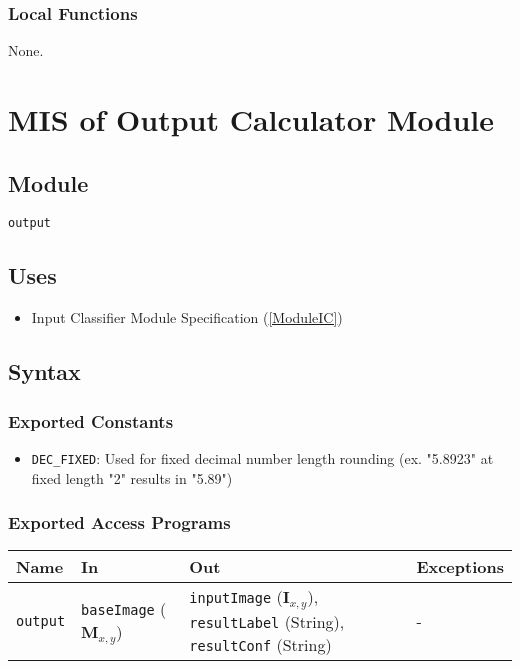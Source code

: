\documentclass[12pt, titlepage]{article}
\def\code#1{\texttt{#1}}
\begin{document}
\subsubsection{Local Functions}

None.

\section{MIS of Output Calculator Module} \label{ModuleO} 


\subsection{Module}

\code{output}

\subsection{Uses}

\begin{itemize}
  \item Input Classifier Module Specification (\ref{ModuleIC})
\end{itemize}

\subsection{Syntax}

\subsubsection{Exported Constants}

\begin{itemize}
  \item \code{DEC\_FIXED}: Used for fixed decimal number length rounding (ex. "5.8923" at fixed length "2" results in "5.89")
\end{itemize}

\subsubsection{Exported Access Programs}

\begin{center}
\begin{tabular}{p{2cm} p{2cm} p{6cm} p{2cm}}
\hline
\textbf{Name} & \textbf{In} & \textbf{Out} & \textbf{Exceptions} \\
\hline
\code{output} & \code{baseImage} ($\mathbf{M}_{x,y}$) & \code{inputImage} ($\mathbf{I}_{x,y}$), \code{resultLabel} (String), \code{resultConf} (String) & - \\
\hline
\end{tabular}
\end{center}
\end{document}
